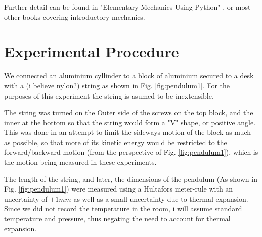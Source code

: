 \documentclass[%
 reprint,
 amsmath,amssymb,
 aps,
]{revtex4-1}
\begin{document}
	Further detail can be found in "Elementary Mechanics Using Python" \cite{elempy}, or most other books covering introductory mechanics.

\section{\label{section:experimentalproced}Experimental Procedure}
    
    We connected an aluminium cyllinder to a block of aluminium secured to a desk with a (i believe nylon?) string as shown in Fig. \ref{fig:pendulum1}. For the purposes of this experiment the string is asumed to be inextensible. 

    The string was turned on the Outer side of the screws on the top block, and the inner at the bottom so that the string would form a "V" shape, or positive angle. This was done in an attempt to limit the sideways motion of the block as much as possible, so that more of its kinetic energy would be restricted to the forward/backward motion (from the perspective of Fig. \ref{fig:pendulum1}), which is the motion being measured in these experiments.

    The length of the string, and later, the dimensions of the pendulum (As shown in Fig. \ref{fig:pendulum1}) were measured using a Hultafors meter-rule with an uncertainty of $\pm 1mm$ as well as a small uncertainty due to thermal expansion. Since we did not record the temperature in the room, i will assume standard temperature and pressure, thus negating the need to account for thermal expansion.
\end{document}
